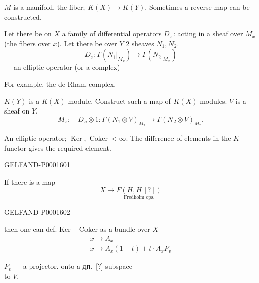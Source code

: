$M$ is a manifold, the fiber; $K (X)\longrightarrow K (Y)$.
Sometimes a reverse map can be constructed.

Let there be on $X$ a family of differential operators $D_x$:
acting in a sheaf over $M_x$ (the fibers over $x$).
Let there be over $Y$ $2$ sheaves $N_1, N_2$.
\begin{equation*}
D_x:\Gamma (N_1|_{M_x})\longrightarrow\Gamma (N_2|_{M_x})
\end{equation*}
— an elliptic operator (or a complex)

For example, the de Rham complex.

$K (Y)$ is a $K (X)$-module. Construct such a map of $K (X)$-modules.
$V$ is a sheaf on $Y$.
\begin{equation*}
M_x:\quad D_x\otimes1:\Gamma (N_1\otimes V)_{M_x}\longrightarrow\Gamma (N_2\otimes V)_{M_x}.
\end{equation*}

An elliptic operator; $\operatorname{Ker},\operatorname{Coker}<\infty$.
The difference of elements in the $K$-functor gives the required element.



\clearpage

\begin{GelfandAdjacentEvidence}{GELFAND-P000160}{1}
\hfill{}


If there is a map
\begin{equation*}
X\longrightarrow\underset{\text{Fredholm ops.}}{F (H, H\, [?])}
\end{equation*}
\end{GelfandAdjacentEvidence}
\begin{GelfandAdjacentEvidence}{GELFAND-P000160}{2}

then one can def. $\mathrm{Ker}-\mathrm{Coker}$ as a bundle over $X$
\begin{gather*}
x\longrightarrow A_x\\
x\longrightarrow A_x (1-t)+t\cdot A_xP_v
\end{gather*}
\begin{flushright}
$P_v$ — a projector. onto a дп.\, [?] subspace\\
to $V$.
\end{flushright}
\end{GelfandAdjacentEvidence}


